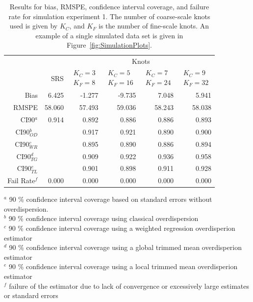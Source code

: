 \documentclass[12pt, titlepage]{article}\usepackage[]{graphicx}\usepackage[]{color}
\begin{document}


\footnotesize
\begin{table}[ht]
\caption{Results for bias, RMSPE, confidence interval coverage, and failure rate for simulation experiment 1. The number of coarse-scale knots used is given by $K_C$, and $K_F$ is the number of fine-scale knots. An example of a single simulated data set is given in Figure~\ref{fig:SimulationPlots}. \label{Tab:Sim1}}
\begin{center}
\begin{tabular}{rrrrrr}
  \hline
  \hline
	&  & \multicolumn{4}{c}{Knots} \\ 
 & SRS & $\begin{array}{c}K_C=3  \\ K_F=8 \end{array}$ & $\begin{array}{c}K_C=5  \\ K_F=16 \end{array}$ & $\begin{array}{c}K_C=7  \\ K_F=24 \end{array}$ & $\begin{array}{c}K_C=9  \\ K_F=32 \end{array}$ \\
  \hline
 Bias & 6.425 & -1.277 & -9.735 & 7.048 & 5.941 \\ 
  RMSPE & 58.060 & 57.493 & 59.036 & 58.243 & 58.038 \\ 
  CI90$^a$ & 0.914 & 0.892 & 0.886 & 0.886 & 0.893 \\ 
  CI90$_{OD}^b$ &  & 0.917 & 0.921 & 0.890 & 0.900 \\ 
  CI90$_{WR}^c$ &  & 0.895 & 0.890 & 0.886 & 0.894 \\ 
  CI90$_{TG}^d$ &  & 0.909 & 0.922 & 0.936 & 0.958 \\ 
  CI90$_{TL}^e$ &  & 0.901 & 0.898 & 0.911 & 0.928 \\ 
  Fail Rate$^f$ & 0.000 & 0.000 & 0.000 & 0.000 & 0.000 \\ 
  

   \hline
\end{tabular}
\end{center}
\textrm{$^a$ 90 \% confidence interval coverage based on standard errors without overdispersion.} \\ 
\textrm{$^b$ 90 \% confidence interval coverage using classical overdispersion} \\
\textrm{$^c$ 90 \% confidence interval coverage using a weighted regression overdisperion estimator} \\
\textrm{$^d$ 90 \% confidence interval coverage using a global trimmed mean overdisperion estimator} \\
\textrm{$^e$ 90 \% confidence interval coverage using a local trimmed mean overdisperion estimator} \\
\textrm{$^f$ failure of the estimator due to lack of convergence or excessively large estimates or standard errors} \\
\end{table}
\end{document}
